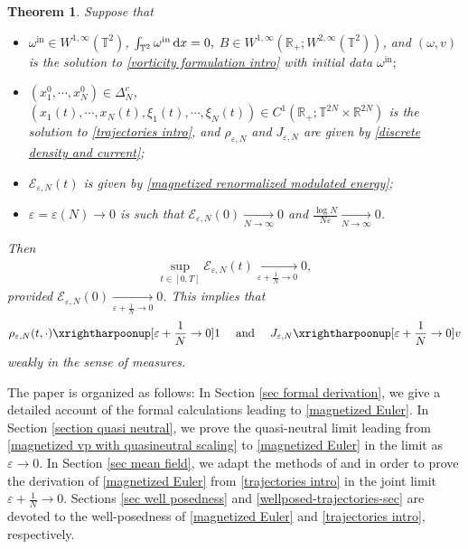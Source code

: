 \documentclass[11pt,reqno]{amsart}
\newtheorem{thm}{Theorem}[section]
\numberwithin{equation}{section}
\def\dd{{\rm d}}
\begin{document}
\begin{thm}
Suppose that
\begin{itemize}
  \item[{\rm(i)}] $\omega^{\mathrm{in}}\in W^{1,\infty}( \mathbb{T}^{2})$, $\int_{\mathbb T^2}\omega^{\mathrm{in}}\,\dd x=0,$ $B\in W^{1,\infty}(\mathbb{R}_{+};W^{2,\infty}(\mathbb{T}^{2}))$, 
  and $(\omega,v)$ is the solution to \eqref{vorticity formulation intro} with initial data $\omega^{\mathrm{in}};$
    \item[{\rm(ii)}] $(x_{1}^{0},\cdots\!,x_{N}^{0})\in \Delta_{N}^{c}$, 
    $(x_{1}(t),\cdots\!,x_{N}(t),\xi_{1}(t),\cdots\! ,\xi_{N}(t))\in C^{1}(\mathbb{R}_{+};\mathbb{T}^{2N}\times \mathbb{R}^{2N})$ is the solution to \eqref{trajectories intro},
    and $\rho_{\varepsilon,N}$ and 
    $J_{\varepsilon,N}$ are given by \eqref{discrete density and current}{\rm;}
   \item[{\rm(iii)}] $\mathcal{E}_{\varepsilon,N}(t)$ is given by \eqref{magnetized renormalized modulated energy}{\rm;}
    \item[{\rm(iv)}]$\varepsilon=\varepsilon(N)\to0$ is such that  $\mathcal{E}_{\varepsilon,N}(0)\underset{N\rightarrow \infty}{\longrightarrow }0$ and $\frac{\log N}{N \varepsilon}\underset{N\rightarrow \infty}{\longrightarrow}0$. 
\end{itemize}
Then
\begin{align*}
\underset{t\in [0,T]}{\sup}\mathcal{E}_{\varepsilon,N}(t)\underset{\varepsilon+\frac{1}{N}\rightarrow 0}{\longrightarrow} 0,
\end{align*}
provided 
$\mathcal{E}_{\varepsilon,N}(0)\underset{\varepsilon+\frac{1}{N}\rightarrow 0}{\longrightarrow}0$.    
This implies that
\begin{align*}
\rho_{\varepsilon,N}(t,\cdot)\xrightharpoonup[{\varepsilon+\frac{1}{N}\rightarrow 0}]{}1 
\quad\,\, \mbox{and} \quad\,\, 
J_{\varepsilon,N}\xrightharpoonup[\varepsilon+\frac{1}{N}\rightarrow 0]{}v
\end{align*}
weakly in the sense of measures. \label{main thm renormalized}
\end{thm}

The paper is organized as follows: 
In Section \ref{sec formal derivation}, we give a detailed account of the formal calculations 
leading to \eqref{magnetized Euler}. 
In Section \ref{section quasi neutral}, we prove the quasi-neutral limit leading 
from \eqref{magnetized vp with quasineutral scaling} to \eqref{magnetized Euler} 
in the limit as $\varepsilon \rightarrow 0$. 
In Section \ref{sec mean field}, we adapt the methods of \cite{duerinckx2020mean} 
and \cite{han2021newton} in order to prove the derivation of \eqref{magnetized Euler} from \eqref{trajectories intro} in the joint limit $\varepsilon+\frac{1}{N}{\rightarrow}0$. 
Sections \ref{sec well posedness} and \ref{wellposed-trajectories-sec} are devoted 
to the well-posedness of \eqref{magnetized Euler} and \eqref{trajectories intro}, respectively.   
\end{document}
